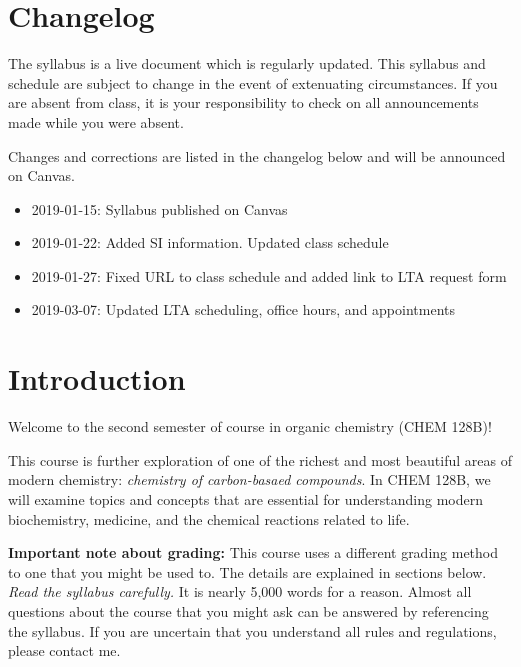 \hypertarget{changelog}{%
\section{Changelog}\label{changelog}}

The syllabus is a live document which is regularly updated. This
syllabus and schedule are subject to change in the event of extenuating
circumstances. If you are absent from class, it is your responsibility
to check on all announcements made while you were absent.

Changes and corrections are listed in the changelog below and will be
announced on Canvas.

\begin{itemize}
\tightlist
\item
  2019-01-15: Syllabus published on Canvas
\item
  2019-01-22: Added SI information. Updated class schedule
\item
  2019-01-27: Fixed URL to class schedule and added link to LTA request
  form
\item
  2019-03-07: Updated LTA scheduling, office hours, and appointments
\end{itemize}

\newpage

\hypertarget{introduction}{%
\section{Introduction}\label{introduction}}

Welcome to the second semester of course in organic chemistry (CHEM
128B)!

This course is further exploration of one of the richest and most
beautiful areas of modern chemistry: \emph{chemistry of carbon-basaed
compounds}. In CHEM 128B, we will examine topics and concepts that are
essential for understanding modern biochemistry, medicine, and the
chemical reactions related to life.

\textbf{Important note about grading:} This course uses a different
grading method to one that you might be used to. The details are
explained in sections below. \emph{Read the syllabus carefully.} It is
nearly 5,000 words for a reason. Almost all questions about the course
that you might ask can be answered by referencing the syllabus. If you
are uncertain that you understand all rules and regulations, please
contact me.

